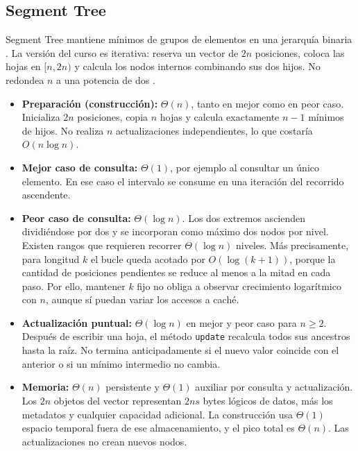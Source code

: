 \subsection{Segment Tree}

Segment Tree mantiene mínimos de grupos de elementos en una jerarquía binaria
\cite{cp-segment-tree}. La versión del curso es iterativa: reserva un vector
de \(2n\) posiciones, coloca las hojas en \([n,2n)\) y calcula los nodos
internos combinando sus dos hijos. No redondea \(n\) a una potencia de dos
\cite{edaa-segment-tree}.

\begin{itemize}
    \setlength{\itemsep}{2pt}
    \setlength{\parskip}{0pt}
    \item \textbf{Preparación (construcción):} \(\Theta(n)\), tanto en mejor
    como en peor caso. Inicializa \(2n\) posiciones, copia \(n\) hojas y
    calcula exactamente \(n-1\) mínimos de hijos. No realiza \(n\)
    actualizaciones independientes, lo que costaría \(O(n\log n)\).
    \item \textbf{Mejor caso de consulta:} \(\Theta(1)\), por ejemplo al
    consultar un único elemento. En ese caso el intervalo se consume en
    una iteración del recorrido ascendente.
    \item \textbf{Peor caso de consulta:} \(\Theta(\log n)\). Los dos
    extremos ascienden dividiéndose por dos y se incorporan como máximo
    dos nodos por nivel. Existen rangos que requieren recorrer
    \(\Theta(\log n)\) niveles. Más precisamente, para longitud \(k\)
    el bucle queda acotado por \(O(\log(k+1))\), porque la cantidad de
    posiciones pendientes se reduce al menos a la mitad en cada paso.
    Por ello, mantener \(k\) fijo no obliga a observar crecimiento
    logarítmico con \(n\), aunque sí puedan variar los accesos a caché.
    \item \textbf{Actualización puntual:} \(\Theta(\log n)\) en mejor y
    peor caso para \(n\geq2\). Después de escribir una hoja, el método
    \texttt{update} recalcula todos sus ancestros hasta la raíz. No termina
    anticipadamente si el nuevo valor coincide con el anterior o si un
    mínimo intermedio no cambia.
    \item \textbf{Memoria:} \(\Theta(n)\) persistente y \(\Theta(1)\)
    auxiliar por consulta y actualización. Los \(2n\) objetos del vector
    representan \(2ns\) bytes lógicos de datos, más los metadatos y
    cualquier capacidad adicional. La construcción usa \(\Theta(1)\)
    espacio temporal fuera de ese almacenamiento, y el pico total es
    \(\Theta(n)\). Las actualizaciones no crean nuevos nodos.
\end{itemize}

